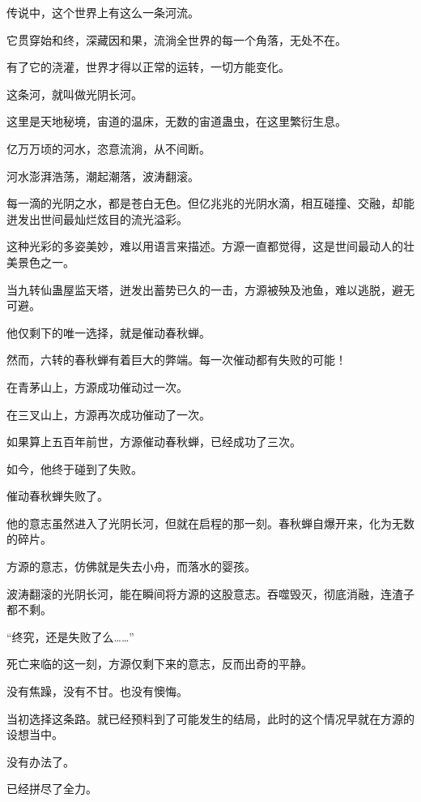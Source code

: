 
\begin{this_body}

传说中，这个世界上有这么一条河流。

它贯穿始和终，深藏因和果，流淌全世界的每一个角落，无处不在。

有了它的浇灌，世界才得以正常的运转，一切方能变化。

这条河，就叫做光阴长河。

这里是天地秘境，宙道的温床，无数的宙道蛊虫，在这里繁衍生息。

亿万万顷的河水，恣意流淌，从不间断。

河水澎湃浩荡，潮起潮落，波涛翻滚。

每一滴的光阴之水，都是苍白无色。但亿兆兆的光阴水滴，相互碰撞、交融，却能迸发出世间最灿烂炫目的流光溢彩。

这种光彩的多姿美妙，难以用语言来描述。方源一直都觉得，这是世间最动人的壮美景色之一。

当九转仙蛊屋监天塔，迸发出蓄势已久的一击，方源被殃及池鱼，难以逃脱，避无可避。

他仅剩下的唯一选择，就是催动春秋蝉。

然而，六转的春秋蝉有着巨大的弊端。每一次催动都有失败的可能！

在青茅山上，方源成功催动过一次。

在三叉山上，方源再次成功催动了一次。

如果算上五百年前世，方源催动春秋蝉，已经成功了三次。

如今，他终于碰到了失败。

催动春秋蝉失败了。

他的意志虽然进入了光阴长河，但就在启程的那一刻。春秋蝉自爆开来，化为无数的碎片。

方源的意志，仿佛就是失去小舟，而落水的婴孩。

波涛翻滚的光阴长河，能在瞬间将方源的这股意志。吞噬毁灭，彻底消融，连渣子都不剩。

“终究，还是失败了么……”

死亡来临的这一刻，方源仅剩下来的意志，反而出奇的平静。

没有焦躁，没有不甘。也没有懊悔。

当初选择这条路。就已经预料到了可能发生的结局，此时的这个情况早就在方源的设想当中。

没有办法了。

已经拼尽了全力。


\end{this_body}
